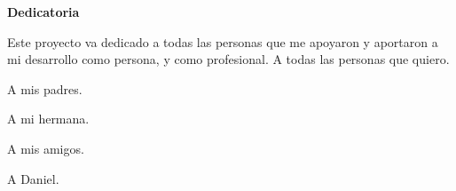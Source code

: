 \begin{center}
    \textbf{Dedicatoria}
    
    Este proyecto va dedicado a todas las personas que me apoyaron y aportaron a mi desarrollo como persona, y como profesional. A todas las personas que quiero.
    
    \vspace{7cm}
    
    A mis padres.
    
    A mi hermana.
    
    A mis amigos.

    \vspace{7cm}

    A Daniel.

\end{center}



\newpage
